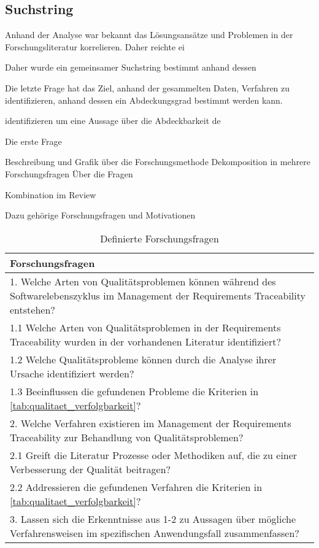 \subsection{Suchstring}

Anhand der Analyse war bekannt das Lösungsansätze und Problemen in der Forschungsliteratur korrelieren. Daher reichte ei

Daher wurde ein gemeinsamer Suchstring bestimmt anhand dessen 

Die letzte Frage hat das Ziel, anhand der gesammelten Daten, Verfahren zu identifizieren, anhand dessen ein Abdeckungsgrad bestimmt werden kann.

identifizieren um eine Aussage über die Abdeckbarkeit de

Die erste Frage 


Beschreibung und Grafik über die Forschungsmethode
    Dekomposition in mehrere Forschungsfragen
        Über die Fragen
        
        
    Kombination im Review

Dazu gehörige Forschungsfragen und Motivationen

\begin{table*}[t]
\renewcommand{\arraystretch}{1.3}

\centering
\begin{tabularx}{\textwidth}{@{}X@{}}
\toprule
Forschungsfragen \\ \midrule
1. Welche Arten von Qualitätsproblemen können während des Softwarelebenszyklus im Management der Requirements Traceability entstehen? \\
\hspace*{10mm}1.1 Welche Arten von Qualitätsproblemen in der Requirements Traceability wurden in der vorhandenen Literatur identifiziert? \\
\hspace*{10mm}1.2 Welche Qualitätsprobleme können durch die Analyse ihrer Ursache identifiziert werden? \\
\hspace*{10mm}1.3 Beeinflussen die gefundenen Probleme die Kriterien in \ref{tab:qualitaet_verfolgbarkeit}? \\
2. Welche Verfahren existieren im Management der Requirements Traceability zur Behandlung von Qualitätsproblemen? \\
\hspace*{10mm}2.1 Greift die Literatur Prozesse oder Methodiken auf, die zu einer Verbesserung der Qualität beitragen? \\
\hspace*{10mm}2.2 Addressieren die gefundenen Verfahren die Kriterien in \ref{tab:qualitaet_verfolgbarkeit}? \\
3. Lassen sich die Erkenntnisse aus 1-2 zu Aussagen über mögliche Verfahrensweisen im spezifischen Anwendungsfall zusammenfassen? \\
\bottomrule
\end{tabularx}
\caption{Definierte Forschungsfragen}
\label{tab:forschungsfragen}
\end{table*}


